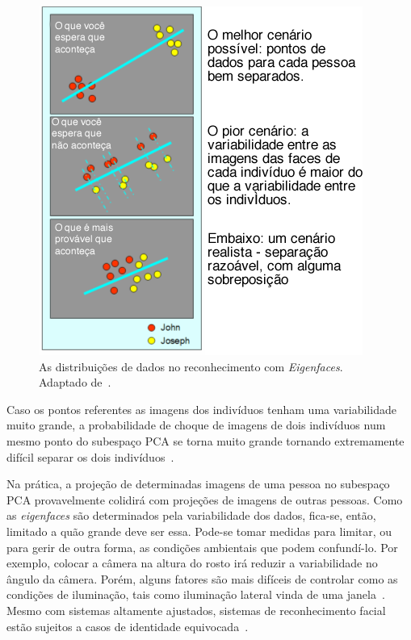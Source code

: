 	\begin{figure}[htb]
		\begin{center}
			\includegraphics[scale=6.0]{figuras/2.FundamentacaoTeorica/espacoPCA.png}
		\end{center}
		\caption{As distribuições de dados no reconhecimento com \textit{Eigenfaces}. Adaptado de~\cite{hewitt}.}
		\label{exemploEspacoPCA}
	\end{figure}
	
	Caso os pontos referentes as imagens dos indivíduos tenham uma variabilidade
	muito grande, a probabilidade de choque de imagens de dois indivíduos num mesmo
	ponto do subespaço PCA se torna muito grande tornando extremamente difícil
	separar os dois indivíduos~\cite{hewitt}.
	
	Na prática, a projeção de determinadas imagens de uma pessoa no subespaço PCA
	provavelmente colidirá com projeções de imagens de outras pessoas. Como as
	\textit{eigenfaces} são determinados pela variabilidade dos dados, fica-se,
	então, limitado a quão grande deve ser essa. Pode-se tomar medidas para
	limitar, ou para gerir de outra forma, as condições ambientais que podem
	confundí-lo. Por exemplo, colocar a câmera na altura do rosto irá reduzir a
	variabilidade no ângulo da câmera. Porém, alguns fatores são mais difíceis de controlar como as
	condições de iluminação, tais como iluminação lateral vinda de uma
	janela~\cite{hewitt}. Mesmo com sistemas altamente ajustados, sistemas de
	reconhecimento facial estão sujeitos a casos de identidade equivocada~\cite{hewitt}.

